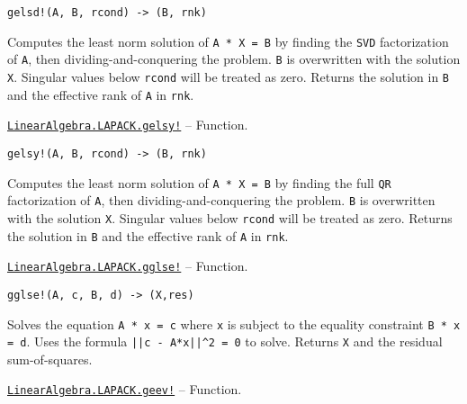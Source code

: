 \begin{adjustwidth}{2em}{0pt}


\begin{verbatim}
gelsd!(A, B, rcond) -> (B, rnk)
\end{verbatim}

Computes the least norm solution of \texttt{A * X = B} by finding the \texttt{SVD} factorization of \texttt{A}, then dividing-and-conquering the problem. \texttt{B} is overwritten with the solution \texttt{X}. Singular values below \texttt{rcond} will be treated as zero. Returns the solution in \texttt{B} and the effective rank of \texttt{A} in \texttt{rnk}.



\end{adjustwidth}
\hypertarget{4643805579678817866}{} 
\hyperlink{4643805579678817866}{\texttt{LinearAlgebra.LAPACK.gelsy!}}  -- {Function.}

\begin{adjustwidth}{2em}{0pt}


\begin{verbatim}
gelsy!(A, B, rcond) -> (B, rnk)
\end{verbatim}

Computes the least norm solution of \texttt{A * X = B} by finding the full \texttt{QR} factorization of \texttt{A}, then dividing-and-conquering the problem. \texttt{B} is overwritten with the solution \texttt{X}. Singular values below \texttt{rcond} will be treated as zero. Returns the solution in \texttt{B} and the effective rank of \texttt{A} in \texttt{rnk}.



\end{adjustwidth}
\hypertarget{6779153008628150661}{} 
\hyperlink{6779153008628150661}{\texttt{LinearAlgebra.LAPACK.gglse!}}  -- {Function.}

\begin{adjustwidth}{2em}{0pt}


\begin{verbatim}
gglse!(A, c, B, d) -> (X,res)
\end{verbatim}

Solves the equation \texttt{A * x = c} where \texttt{x} is subject to the equality constraint \texttt{B * x = d}. Uses the formula \texttt{||c - A*x||{\textasciicircum}2 = 0} to solve. Returns \texttt{X} and the residual sum-of-squares.



\end{adjustwidth}
\hypertarget{6944763016389470144}{} 
\hyperlink{6944763016389470144}{\texttt{LinearAlgebra.LAPACK.geev!}}  -- {Function.}

